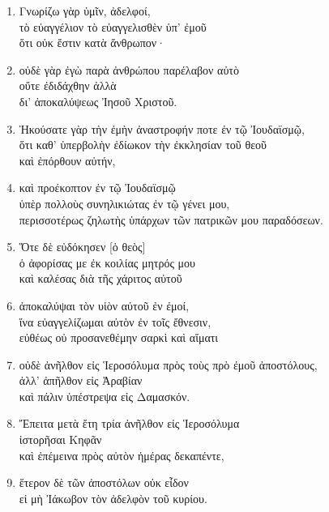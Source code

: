 \documentclass[12pt,a4paper,titlepage]{article}
\newlength{\indentunit}
\newlength{\curindent}
\newcommand{\indentlvl}[1]{\setlength{\curindent}{#1\indentunit}\hspace*{\curindent}}
\newcommand{\brk}{\\
\hspace*{\curindent}} %
\def \pscolor{red} %
\def \pslabelsep{0.3em} %
\def \psleftmargin{1.5em} %
\begin{document}
\begin{enumerate}[leftmargin=\psleftmargin, labelsep=\pslabelsep, label=\arabic*, align=right, font=\fontspec{Linux Libertine}\color{\pscolor}\small\textsuperscript, parsep=0em, itemsep=0em, topsep=0em]
        \subsection*{La révélation du Fils de Dieu et la mission de Paul}
  \item Γνωρίζω γὰρ ὑμῖν, ἀδελφοί,\\
        \indentlvl{1}τὸ εὐαγγέλιον τὸ εὐαγγελισθὲν ὑπ’ ἐμοῦ\brk
        ὅτι οὐκ ἔστιν κατὰ ἄνθρωπον·
  \item οὐδὲ γὰρ ἐγὼ παρὰ ἀνθρώπου παρέλαβον αὐτὸ\\
        \indentlvl{1} οὔτε ἐδιδάχθην ἀλλὰ\\
        \indentlvl{2}δι’ ἀποκαλύψεως Ἰησοῦ Χριστοῦ.
  \item Ἠκούσατε γὰρ τὴν ἐμὴν ἀναστροφήν ποτε ἐν τῷ Ἰουδαϊσμῷ,\\
        \indentlvl{1}ὅτι καθ’ ὑπερβολὴν ἐδίωκον τὴν ἐκκλησίαν τοῦ θεοῦ \brk
        καὶ ἐπόρθουν αὐτήν,
  \item \indentlvl{1}καὶ προέκοπτον ἐν τῷ Ἰουδαϊσμῷ \\
        \indentlvl{2}ὑπὲρ πολλοὺς συνηλικιώτας ἐν τῷ γένει μου, \brk
        περισσοτέρως ζηλωτὴς ὑπάρχων τῶν πατρικῶν μου παραδόσεων.
  \item Ὅτε δὲ εὐδόκησεν [ὁ θεὸς]  \\
        \indentlvl{1}ὁ ἀφορίσας με ἐκ κοιλίας μητρός μου \brk
        καὶ καλέσας διὰ τῆς χάριτος αὐτοῦ
  \item \indentlvl{2}ἀποκαλύψαι τὸν υἱὸν αὐτοῦ ἐν ἐμοί,\brk
        \indentlvl{2}ἵνα εὐαγγελίζωμαι αὐτὸν ἐν τοῖς ἔθνεσιν, \\
        εὐθέως οὐ προσανεθέμην σαρκὶ καὶ αἵματι
  \item \indentlvl{1}οὐδὲ ἀνῆλθον εἰς Ἱεροσόλυμα πρὸς τοὺς πρὸ ἐμοῦ ἀποστόλους, \\
        ἀλλ’ ἀπῆλθον εἰς Ἀραβίαν \\
        \indentlvl{1}καὶ πάλιν ὑπέστρεψα εἰς Δαμασκόν.
  \item Ἔπειτα μετὰ ἔτη τρία ἀνῆλθον εἰς Ἱεροσόλυμα\\
        \indentlvl{1}ἱστορῆσαι Κηφᾶν \brk
        καὶ ἐπέμεινα πρὸς αὐτὸν ἡμέρας δεκαπέντε,
  \item ἕτερον δὲ τῶν ἀποστόλων οὐκ εἶδον\\
        \indentlvl{1}εἰ μὴ Ἰάκωβον τὸν ἀδελφὸν τοῦ κυρίου.

\end{enumerate}
\end{document}
